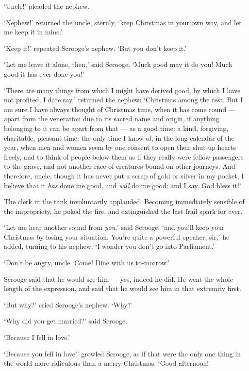 \documentclass[11pt,twoside]{article}\makeatletter
\begin{document}
‘Uncle!’ pleaded the nephew.\par
‘Nephew!’ returned the uncle, sternly, ‘keep Christmas in your own way, and let me keep it in mine.’\par
‘Keep it!’ repeated Scrooge's nephew. ‘But you don't keep it.’\par
‘Let me leave it alone, then,’ said Scrooge. ‘Much good may it do you! Much good it has ever done you!’\par
‘There are many things from which I might have derived good, by which I have not profited, I dare say,’ returned the nephew: ‘Christmas among the rest. But I am sure I have always thought of Christmas time, when it has come round — apart from the veneration due to its sacred name and origin, if anything belonging to it can be apart from that — as a good time: a kind, forgiving, charitable, pleasant time: the only time I know of, in the long calendar of the year, when men and women seem by one consent to open their shut-up hearts freely, and to think of people below them as if they really were fellow-passengers to the grave, and not another race of creatures bound on other journeys. And therefore, uncle, though it has never put a scrap of gold or silver in my pocket, I believe that it \textit{has} done me good, and \textit{will} do me good; and I say, God bless it!’\par
The clerk in the tank involuntarily applauded. Becoming immediately sensible of the impropriety, he poked the fire, and extinguished the last frail spark for ever. \par
‘Let me hear another sound from \textit{you},’ said Scrooge, ‘and you'll keep your Christmas by losing your situation. You're quite a powerful speaker, sir,’ he added, turning to his nephew. ‘I wonder you don't go into Parliament.’\par
‘Don't be angry, uncle. Come! Dine with us to-morrow.’\par
Scrooge said that he would see him — yes, indeed he did. He went the whole length of the expression, and said that he would see him in that extremity first. \par
‘But why?’ cried Scrooge's nephew. ‘Why?’\par
‘Why did you get married?’ said Scrooge.\par
‘Because I fell in love.’\par
‘Because you fell in love!’ growled Scrooge, as if that were the only one thing in the world more ridiculous than a merry Christmas. ‘Good afternoon!’\par
\end{document}
